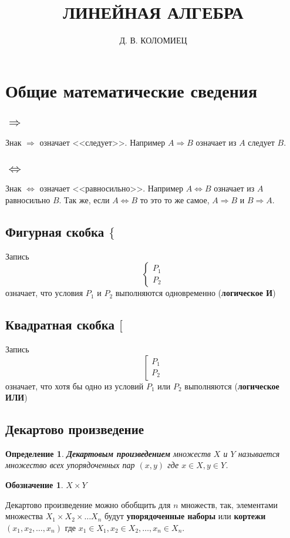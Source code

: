\documentclass[]{article}
\title{ЛИНЕЙНАЯ АЛГЕБРА}
\author{Д. В. КОЛОМИЕЦ}
\theoremstyle{theorem}
\newtheorem{dfn}{Определение}
\theoremstyle{definition}
\newtheorem{sg}{Обозначение}[dfn]
\begin{document}
	\maketitle
	\tableofcontents
	\section{Общие математические сведения}
	\subsection{$\Rightarrow$}
	Знак $\Rightarrow$ означает <<следует>>. Например $A\Rightarrow B$ означает из $A$ следует $B$.
	\subsection{$\Leftrightarrow$}
	Знак $\Leftrightarrow$ означает <<равносильно>>. Например $A\Leftrightarrow B$ означает из $A$ равносильно $B$. Так же, если $A\Leftrightarrow B$ то это то же самое, $A\Rightarrow B$ и $B\Rightarrow A$.
	\subsection{Фигурная скобка $\{$}
	Запись
	\begin{equation*}
		\begin{cases}
			P_1
			\\
			P_2
		\end{cases}
	\end{equation*}
	означает, что условия $P_1$ и $P_2$ выполняются одновременно (\textbf{логическое И})
	\subsection{Квадратная скобка $[$}
	Запись
	\begin{equation*}
		\left[
		\begin{matrix}
			P_1
			\\
			P_2
		\end{matrix}
		\right.
	\end{equation*}
	означает, что хотя бы одно из условий $P_1$ или $P_2$ выполняются (\textbf{логическое ИЛИ})
	\subsection{Декартово произведение}
	\begin{dfn}
		\textbf{Декартовым произведением} множеств $X$ и $Y$ называется множество всех упорядоченных пар $(x,y)$ где $x\in X, y\in Y$.
	\end{dfn}
	\begin{sg}
		$X\times Y$
	\end{sg}
	Декартово произведение можно обобщить для $n$ множеств, так, элементами множества $X_1\times X_2\times \ldots X_n$ будут \textbf{упорядоченные наборы} или \textbf{кортежи} $(x_1, x_2, \ldots, x_n)$ где $x_1\in X_1,x_2\in X_2, \ldots, x_n\in X_n$.
\end{document}
